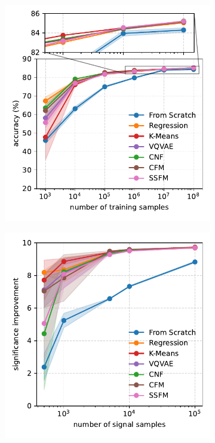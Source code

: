 \begin{figure}[h!]
    \centering
    \begin{subfigure}{0.4\linewidth}
        \centering
        \includegraphics[width=\linewidth]{Figures/foundation_models/mpm2/final/jetclass_finetune.pdf}
        \caption{}
        \label{fig:jetclass}
    \end{subfigure}
    \begin{subfigure}[b]{0.4\textwidth}
        \centering
        \includegraphics[width=\linewidth]{Figures/foundation_models/mpm2/final/cwola_finetune.pdf}

\end{subfigure}
\end{figure}
